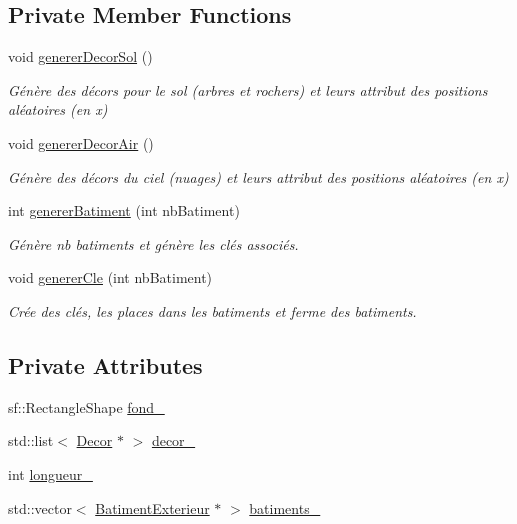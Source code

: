 \subsection*{Private Member Functions}
\begin{DoxyCompactItemize}
\item 
\hypertarget{classExterieur_a33c63ec64c706463932bf18299d77ae4}{void \hyperlink{classExterieur_a33c63ec64c706463932bf18299d77ae4}{generer\-Decor\-Sol} ()}\label{classExterieur_a33c63ec64c706463932bf18299d77ae4}

\begin{DoxyCompactList}\small\item\em Génère des décors pour le sol (arbres et rochers) et leurs attribut des positions aléatoires (en x) \end{DoxyCompactList}\item 
\hypertarget{classExterieur_a79fcb5aa608d8045ef44f41c6055cda9}{void \hyperlink{classExterieur_a79fcb5aa608d8045ef44f41c6055cda9}{generer\-Decor\-Air} ()}\label{classExterieur_a79fcb5aa608d8045ef44f41c6055cda9}

\begin{DoxyCompactList}\small\item\em Génère des décors du ciel (nuages) et leurs attribut des positions aléatoires (en x) \end{DoxyCompactList}\item 
int \hyperlink{classExterieur_a1bfe7da5e31f13adcdeb8e5ea93b6036}{generer\-Batiment} (int nb\-Batiment)
\begin{DoxyCompactList}\small\item\em Génère nb batiments et génère les clés associés. \end{DoxyCompactList}\item 
void \hyperlink{classExterieur_aa50361e549b69bf0654f617d55e84122}{generer\-Cle} (int nb\-Batiment)
\begin{DoxyCompactList}\small\item\em Crée des clés, les places dans les batiments et ferme des batiments. \end{DoxyCompactList}\end{DoxyCompactItemize}
\subsection*{Private Attributes}
\begin{DoxyCompactItemize}
\item 
sf\-::\-Rectangle\-Shape \hyperlink{classExterieur_a32c931a8689eb6b937049c23a1b5c3e6}{fond\-\_\-}
\item 
std\-::list$<$ \hyperlink{classDecor}{Decor} $\ast$ $>$ \hyperlink{classExterieur_af1e89656a647fc1bfc179c4910a7f40d}{decor\-\_\-}
\item 
int \hyperlink{classExterieur_a99f4d23bbf9ed4df9e4e091acacd3d5f}{longueur\-\_\-}
\item 
std\-::vector$<$ \hyperlink{classBatimentExterieur}{Batiment\-Exterieur} $\ast$ $>$ \hyperlink{classExterieur_a172e012b882189a95932a48f15338f3b}{batiments\-\_\-}
\end{DoxyCompactItemize}
